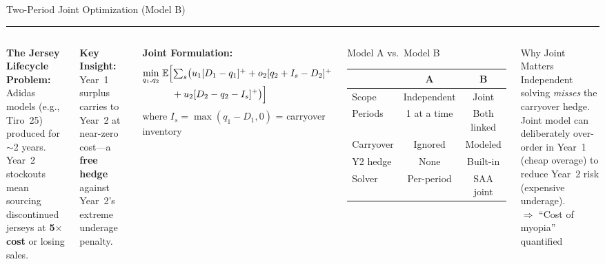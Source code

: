\documentclass[aspectratio=169, 9pt]{beamer}
\newcommand{\goldrule}{\textcolor{PurdueGold}{\rule{\linewidth}{1.2pt}}}
\begin{document}
\begin{frame}{Two-Period Joint Optimization (Model B)}
\goldrule
\vspace{2pt}
\begin{columns}[T]
{\small\textbf{\color{AgedGold}The Jersey Lifecycle Problem:}}\\
{\scriptsize Adidas models (e.g., Tiro~25) produced for ${\sim}$2 years. Year~2 stockouts mean sourcing discontinued jerseys at \textbf{5$\times$ cost} or losing sales.}

\vspace{3pt}
{\small\textbf{\color{AgedGold}Key Insight:}}\\
{\scriptsize Year~1 surplus carries to Year~2 at near-zero cost---a \textbf{free hedge} against Year~2's extreme underage penalty.}

\vspace{3pt}
{\small\textbf{\color{AgedGold}Joint Formulation:}}
{\small\begin{align*}
\min_{q_1, q_2} \; & \mathbb{E}\Bigl[\textstyle\sum_s \bigl( u_1 [D_1 - q_1]^+ + o_2 [q_2 + I_s - D_2]^+ \\[-2pt]
  & \quad + u_2 [D_2 - q_2 - I_s]^+ \bigr)\Bigr]
\end{align*}}%
\vspace{-8pt}
{\scriptsize where $I_s = \max(q_1 - D_1, 0)$ = carryover inventory}

\begin{block}{Model A vs.\ Model B}
\centering\scriptsize
\begin{tabular}{@{}l c c@{}}
\toprule
& \textbf{A} & \textbf{B} \\
\midrule
Scope     & Independent & Joint \\
Periods   & 1 at a time & Both linked \\
Carryover & Ignored     & Modeled \\
Y2 hedge  & None        & Built-in \\
Solver    & Per-period  & SAA joint \\
\bottomrule
\end{tabular}
\end{block}

\vspace{3pt}
\begin{exampleblock}{Why Joint Matters}
\scriptsize
Independent solving \emph{misses} the carryover hedge. Joint model can deliberately over-order in Year~1 (cheap overage) to reduce Year~2 risk (expensive underage).\\[2pt]
$\Rightarrow$ ``Cost of myopia'' quantified
\end{exampleblock}
\end{columns}
\end{frame}
\end{document}
